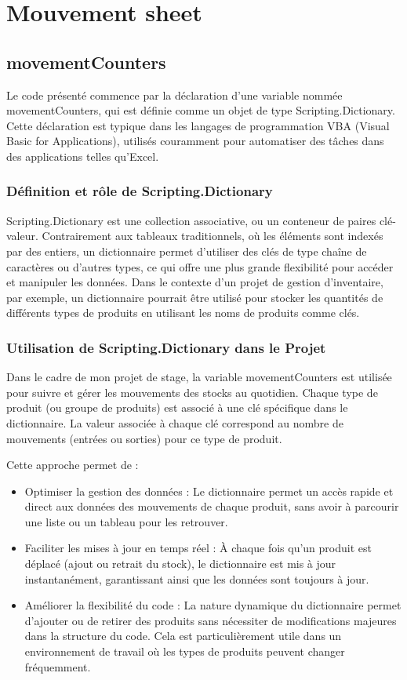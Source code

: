 \documentclass[a4paper, oneside, 12pt, final]{extreport}
\begin{document}
\section{Mouvement sheet}
\subsection{movementCounters}
Le code présenté commence par la déclaration d'une variable nommée movementCounters, qui est définie comme un objet de type Scripting.Dictionary. Cette déclaration est typique dans les langages de programmation VBA (Visual Basic for Applications), utilisés couramment pour automatiser des tâches dans des applications telles qu'Excel.

\subsubsection{Définition et rôle de Scripting.Dictionary}
Scripting.Dictionary est une collection associative, ou un conteneur de paires clé-valeur. Contrairement aux tableaux traditionnels, où les éléments sont indexés par des entiers, un dictionnaire permet d'utiliser des clés de type chaîne de caractères ou d'autres types, ce qui offre une plus grande flexibilité pour accéder et manipuler les données. Dans le contexte d'un projet de gestion d'inventaire, par exemple, un dictionnaire pourrait être utilisé pour stocker les quantités de différents types de produits en utilisant les noms de produits comme clés.

\subsubsection{Utilisation de Scripting.Dictionary dans le Projet}
Dans le cadre de mon projet de stage, la variable movementCounters est utilisée pour suivre et gérer les mouvements des stocks au quotidien. Chaque type de produit (ou groupe de produits) est associé à une clé spécifique dans le dictionnaire. La valeur associée à chaque clé correspond au nombre de mouvements (entrées ou sorties) pour ce type de produit.

Cette approche permet de :
\begin{itemize}


\item Optimiser la gestion des données : Le dictionnaire permet un accès rapide et direct aux données des mouvements de chaque produit, sans avoir à parcourir une liste ou un tableau pour les retrouver.

\item Faciliter les mises à jour en temps réel : À chaque fois qu'un produit est déplacé (ajout ou retrait du stock), le dictionnaire est mis à jour instantanément, garantissant ainsi que les données sont toujours à jour.

\item Améliorer la flexibilité du code : La nature dynamique du dictionnaire permet d'ajouter ou de retirer des produits sans nécessiter de modifications majeures dans la structure du code. Cela est particulièrement utile dans un environnement de travail où les types de produits peuvent changer fréquemment.
\end{itemize}
\end{document}
